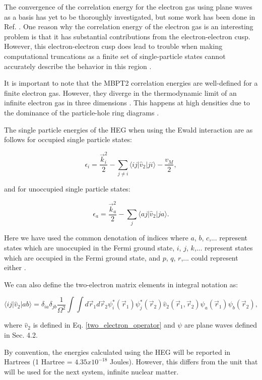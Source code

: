 The convergence of the correlation energy for the electron gas using plane waves as a basis has yet to be thoroughly investigated, but some work has been done in Ref. \cite{Ref1}. One reason why the correlation energy of the electron gas is an interesting problem is that it has substantial contributions from the electron-electron cusp. However, this electron-electron cusp does lead to trouble when making computational truncations as a finite set of single-particle states cannot accurately describe the behavior in this region \cite{Ref1}.

It is important to note that the MBPT2 correlation energies are well-defined for a finite electron gas. However, they diverge in the thermodynamic limit of an infinite electron gas in three dimensions \cite{Ref1}. This happens at high densities due to the dominance of the particle-hole ring diagrams \cite{Ref4}.

The single particle energies of the HEG when using the Ewald interaction are as follows for occupied single particle states:

\begin{equation}
    \epsilon_i = \frac{\vec{k}_i^2}{2} - \sum_{j\neq i} \langle ij| \hat{v}_2 | ji \rangle - \frac{v_M}{2},
\end{equation}

and for unoccupied single particle states:

\begin{equation}
    \epsilon_a = \frac{\vec{k}_a^2}{2} - \sum_j \langle aj | \hat{v}_2 | ja \rangle.
\end{equation}

Here we have used the common denotation of indices where $a$, $b$, $c$,... represent states which are unoccupied in the Fermi ground state, $i$, $j$, $k$,... represent states which are occupied in the Fermi ground state, and $p$, $q$, $r$,... could represent either \cite{Ref1}. 

We can also define the two-electron matrix elements in integral notation as:

\begin{equation}
    \langle ij | \hat{v}_2 | ab \rangle = \delta_{ia}\delta_{jb} \frac{1}{\Omega^2}\int \int d\vec{r}_1 d\vec{r}_2 \psi^*_i(\vec{r}_1)\psi^*_j(\vec{r}_2)\hat{v}_2(\vec{r}_1, \vec{r}_2)\psi_a(\vec{r}_1)\psi_b(\vec{r}_2),
\end{equation}

where $\hat{v}_2$ is defined in Eq. \ref{two_electron_operator} and $\psi$ are plane waves defined in Sec. 4.2.

By convention, the energies calculated using the HEG will be reported in Hartrees (1 Hartree = $4.35x10^{-18}$ Joules). However, this differs from the unit that will be used for the next system, infinite nuclear matter.
